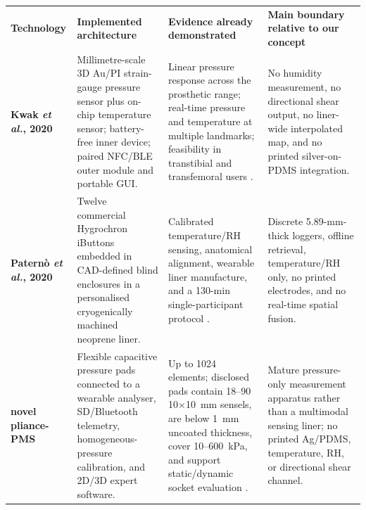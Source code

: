 \begingroup
\fontsize{7.45}{8.75}\selectfont
\setlength{\tabcolsep}{2.6pt}\renewcommand{\arraystretch}{1.05}
\begin{tabularx}{\linewidth}{>{\raggedright\arraybackslash\bfseries\color{AUBRed}}p{3.0cm}Y Y Y}
\color{white}\textbf{Technology} & \color{white}\textbf{Implemented architecture} &
\color{white}\textbf{Evidence already demonstrated} &
\color{white}\textbf{Main boundary relative to our concept} \\
Kwak \textit{et al.}, 2020 & Millimetre-scale 3D Au/PI strain-gauge pressure
sensor plus on-chip temperature sensor; battery-free inner device; paired
NFC/BLE outer module and portable GUI. & Linear pressure response across the
prosthetic range; real-time pressure and temperature at multiple landmarks;
feasibility in transtibial and transfemoral users \cite{q3kwak2020}. & No
humidity measurement, no directional shear output, no liner-wide interpolated
map, and no printed silver-on-PDMS integration. \\
Patern\`o \textit{et al.}, 2020 & Twelve commercial Hygrochron iButtons embedded
in CAD-defined blind enclosures in a personalised cryogenically machined
neoprene liner. & Calibrated temperature/RH sensing, anatomical alignment,
wearable liner manufacture, and a 130-min single-participant protocol
\cite{paterno2020}. & Discrete 5.89-mm-thick loggers, offline retrieval,
temperature/RH only, no printed electrodes, and no real-time spatial fusion. \\
novel pliance-PMS & Flexible capacitive pressure pads connected to a wearable
analyser, SD/Bluetooth telemetry, homogeneous-pressure calibration, and 2D/3D
expert software. & Up to 1024 elements; disclosed pads contain 18--90
10$\times$10~mm sensels, are below 1~mm uncoated thickness, cover 10--600~kPa,
and support static/dynamic socket evaluation \cite{novelpliance2019}. & Mature
pressure-only measurement apparatus rather than a multimodal sensing liner;
no printed Ag/PDMS, temperature, RH, or directional shear channel. \\
\end{tabularx}
\endgroup

